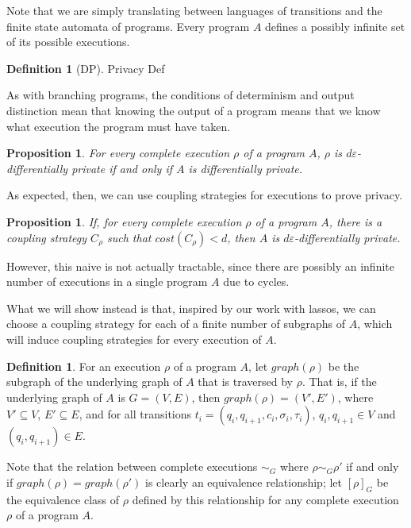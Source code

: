 \documentclass[12pt]{article}
\newtheorem{prop}[thm]{Proposition}
\theoremstyle{definition}
\newtheorem{defn}[thm]{Definition}
\begin{document}
Note that we are simply translating between languages of transitions and the finite state automata of programs. Every program $A$ defines a possibly infinite set of its possible executions. 

\begin{defn}[DP]
    Privacy Def
\end{defn}

As with branching programs, the conditions of determinism and output distinction mean that knowing the output of a program means that we know what execution the program must have taken. 

\begin{prop}
    For every complete execution $\rho$ of a program $A$, $\rho$ is $d\varepsilon$-differentially private if and only if $A$ is differentially private. 
\end{prop}

As expected, then, we can use coupling strategies for executions to prove privacy.

\begin{prop}
    If, for every complete execution $\rho$ of a program $A$, there is a coupling strategy $C_\rho$ such that $cost(C_\rho)<d$, then $A$ is $d\varepsilon$-differentially private.
\end{prop}

However, this naive is not actually tractable, since there are possibly an infinite number of executions in a single program $A$ due to cycles. 

What we will show instead is that, inspired by our work with lassos, we can choose a coupling strategy for each of a finite number of subgraphs of $A$, which will induce coupling strategies for every execution of $A$. 

\begin{defn}
    For an execution $\rho$ of a program $A$, let $graph(\rho)$ be the subgraph of the underlying graph of $A$ that is traversed by $\rho$. That is, if the underlying graph of $A$ is $G=(V, E)$, then $graph(\rho) = (V', E')$, where $V'\subseteq V$, $E'\subseteq E$, and for all transitions $t_i = (q_i, q_{i+1}, c_i, \sigma_i, \tau_i)$, $q_i, q_{i+1}\in V$ and $(q_i, q_{i+1}) \in E$. 
\end{defn}

Note that the relation between complete executions $\sim_G$ where $\rho \sim_G\rho'$ if and only if $graph(\rho) = graph(\rho')$ is clearly an equivalence relationship; let $[\rho]_G$ be the equivalence class of $\rho$ defined by this relationship for any complete execution $\rho$ of a program $A$. 
\end{document}

